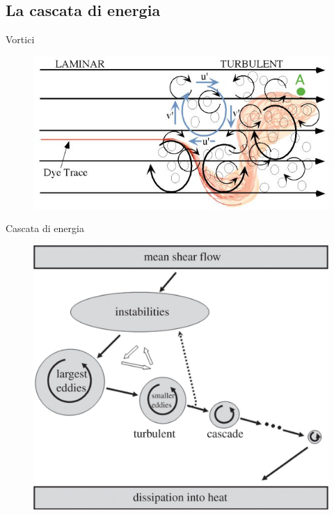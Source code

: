 \documentclass[11pt]{beamer}
\begin{document}
\subsection{La cascata di energia}

\begin{frame}{Vortici}
\begin{figure}
\centering
\includegraphics[scale=0.4]{Airplane_Turbulence_MIT.jpg}
\end{figure}
\end{frame}

\begin{frame}{Cascata di energia}
\begin{figure}
\centering
\includegraphics[scale=0.65]{large.jpg}
\end{figure}
\end{frame}
\end{document}

